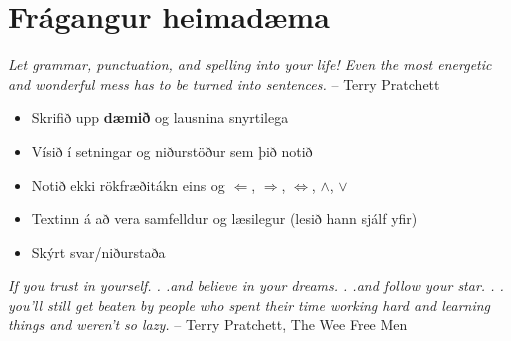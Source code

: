\documentclass[letterpaper,10pt,icelandic]{sphinxmanual}
\begin{document}
\section{Frágangur heimadæma}
\label{vidauki:fragangur-heimadaema}
\emph{Let grammar, punctuation, and spelling into your life! Even the most energetic and wonderful mess has to be turned into sentences.}
-- Terry Pratchett
\begin{itemize}
\item {} 
Skrifið upp \textbf{dæmið} og lausnina snyrtilega

\item {} 
Vísið í setningar og niðurstöður sem þið notið

\item {} 
Notið ekki rökfræðitákn eins og \(\Leftarrow\), \(\Rightarrow\), \(\Leftrightarrow\), \(\wedge\), \(\vee\)

\item {} 
Textinn á að vera samfelldur og læsilegur (lesið hann sjálf yfir)

\item {} 
Skýrt svar/niðurstaða

\end{itemize}

\emph{If you trust in yourself. . .and believe in your dreams. . .and follow your star. . . you'll still get beaten by people who spent their time working hard and learning things and weren't so lazy.}
-- Terry Pratchett, The Wee Free Men
\newpage
\end{document}
